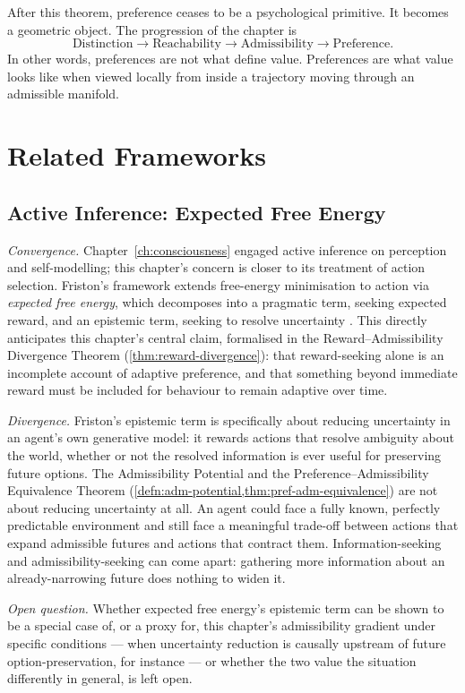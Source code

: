\documentclass[12pt,twoside,openright]{book}
\begin{document}
After this theorem, preference ceases to be a psychological
primitive. It becomes a geometric object. The progression
of the chapter is
\[
  \text{Distinction} \to \text{Reachability}
  \to \text{Admissibility} \to \text{Preference}.
\]
In other words, preferences are not what define value.
Preferences are what value looks like when viewed locally
from inside a trajectory moving through an admissible
manifold.

\section{Related Frameworks}
\label{sec:ch22-related-frameworks}

\subsection*{Active Inference: Expected Free Energy}

\emph{Convergence.} Chapter~\ref{ch:consciousness} engaged
active inference on perception and self-modelling; this
chapter's concern is closer to its treatment of action
selection. Friston's framework extends free-energy minimisation
to action via \emph{expected free energy}, which decomposes into
a pragmatic term, seeking expected reward, and an epistemic
term, seeking to resolve uncertainty \parencite{friston2010}.
This directly anticipates this chapter's central claim, formalised
in the Reward--Admissibility Divergence Theorem
(\cref{thm:reward-divergence}): that reward-seeking alone is an
incomplete account of adaptive preference, and that something
beyond immediate reward must be included for behaviour to remain
adaptive over time.

\emph{Divergence.} Friston's epistemic term is specifically about
reducing uncertainty in an agent's own generative model: it
rewards actions that resolve ambiguity about the world, whether
or not the resolved information is ever useful for preserving
future options. The Admissibility Potential and the
Preference--Admissibility Equivalence Theorem
(\cref{defn:adm-potential,thm:pref-adm-equivalence}) are not
about reducing uncertainty at all. An agent could face a fully
known, perfectly predictable environment and still face a
meaningful trade-off between actions that expand admissible
futures and actions that contract them. Information-seeking and
admissibility-seeking can come apart: gathering more information
about an already-narrowing future does nothing to widen it.

\emph{Open question.} Whether expected free energy's epistemic
term can be shown to be a special case of, or a proxy for, this
chapter's admissibility gradient under specific conditions ---
when uncertainty reduction is causally upstream of future
option-preservation, for instance --- or whether the two value
the situation differently in general, is left open.
\end{document}
